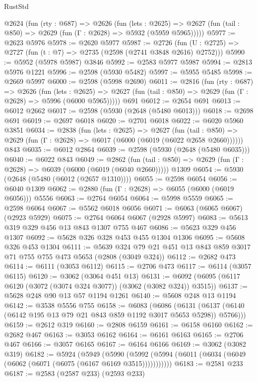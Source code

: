 \begin{lexlean}{RustStd}
\begin{coremodule}
  @2624
    (fun (rty : @687) =>
    @2626
      (fun (lets : @2625) =>
      @2627 (fun (tail : @850) => @2629 (fun (Γ : @2628) => @5932 (@5959 @5965)))))
@5977 := @2623 @5976
@5978 := @2620 @5977
@5987 := @2726 (fun (U : @2725) => @2727 (fun (t : @7) => @2735 (@2598 (@2741 @3848 @2616) @2752)))
@5990 := @5952 (@5978 @5987) @3846
@5992 := @2583 @5977 @5987
@5994 := @2813 @5976 @1221
@5996 := @2598 (@5930 @5482)
@5997 := @5955 @5485
@5998 := @2669 @5997
@6000 := @2598 (@5998 @2690)
@6011 := @2816
    (fun (rty : @687) =>
    @2626
      (fun (lets : @2625) =>
      @2627 (fun (tail : @850) => @2629 (fun (Γ : @2628) => @5996 (@6000 @5965)))))
    @691
@6012 := @2654 @691
@6013 := @6012 @2662
@6017 := @2598 (@5930 (@2648 (@5480 @6013)))
@6018 := @2698 @691
@6019 := @2697 @6018
@6020 := @2701 @6018
@6022 := @6020 @5960 @3851
@6034 := @2838
    (fun (lets : @2625) =>
    @2627
      (fun (tail : @850) => @2629 (fun (Γ : @2628) => @6017 (@6000 (@6019 (@6022 @2658 @2660))))))
    @843
@6035 := @6012 @2864
@6039 := @2598 (@5930 (@2648 (@5480 @6035)))
@6040 := @6022 @843
@6049 := @2862
    (fun (tail : @850) => @2629 (fun (Γ : @2628) => @6039 (@6000 (@6019 (@6040 @2660)))))
    @1309
@6054 := @5930 (@2648 (@5480 (@6012 (@2657 @1310))))
@6055 := @2598 @6054
@6056 := @6040 @1309
@6062 := @2880 (fun (Γ : @2628) => @6055 (@6000 (@6019 @6056))) @5556
@6063 := @2764 @6054
@6064 := @5998 @5559
@6065 := @2598 @6064
@6067 := @5562 @6018 @6056
@6071 := @6063 (@6065 @6067) (@2923 @5929)
@6075 := @2764 @6064 @6067 (@2928 @5997)
@6083 := @5613 @319 @329 @456 @13 @843 @1307 @755 @467
@6086 := @5623 @329 @456 @1307
@6092 := @5628 @326 @328 @453 @455 @1304 @1306
@6095 := @5608 @326 @453 @1304
@6111 := @5639 @324 @79 @21 @451 @13 @843 @859 @3017 @71 @755 @755 @473 @5653 (@2808 (@3049 @324))
@6112 := @2682 @473
@6114 := @6111 (@3053 @6112)
@6115 := @2706 @473
@6117 := @6114 (@3057 @6115)
@6120 := @3062 (@3064 @451 @13)
@6131 := @6092 (@6095 (@6117 @6120 (@3072 (@3074 @324 @3077)) (@3062 (@3082 @324)) @3515))
@6137 := @5628 @248 @90 @13 @57 @1194 @1261
@6140 := @5608 @248 @13 @1194
@6142 := @3538 @5556 @755
@6158 := @6083
    (@6086 (@6131 (@6137 (@6140 (@6142 @195 @13 @79 @21 @843 @859 @1192 @3017 @5653 @5298)) @5766)))
@6159 := @2612 @319
@6160 := @2808 @6159
@6161 := @6158 @6160
@6162 := @2682 @467
@6163 := @3053 @6162
@6164 := @6161 @6163
@6165 := @2706 @467
@6166 := @3057 @6165
@6167 := @6164 @6166
@6169 := @3062 (@3082 @319)
@6182 := @5924
    (@5949
      (@5990 (@5992 (@5994 (@6011 (@6034 (@6049 (@6062 (@6071 (@6075 (@6167 @6169 @3515)))))))))))
@6183 := @2581 @233
@6187 := @2583 (@2587 @233) (@2593 @233)

\end{coremodule}
\end{lexlean}

